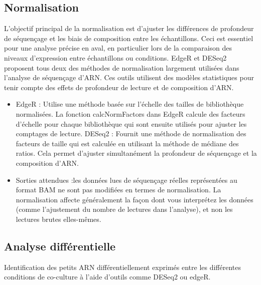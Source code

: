 \documentclass{report}
\begin{document}
\subsection{Normalisation}
L’objectif principal de la normalisation est d’ajuster les différences de profondeur de séquençage et les biais de composition entre les échantillons. Ceci est essentiel pour une analyse précise en aval, en particulier lors de la comparaison des niveaux d’expression entre échantillons ou conditions.
EdgeR\cite{robinson2010edger} et DESeq2\cite{love2014moderated} proposent tous deux des méthodes de normalisation largement utilisées dans l’analyse de séquençage d’ARN. Ces outils utilisent des modèles statistiques pour tenir compte des effets de profondeur de lecture et de composition d’ARN. \\

\begin{itemize}
    \item EdgeR : Utilise une méthode basée sur l'échelle des tailles de bibliothèque normalisées. La fonction calcNormFactors dans EdgeR calcule des facteurs d'échelle pour chaque bibliothèque qui sont ensuite utilisés pour ajuster les comptages de lecture.
    DESeq2 : Fournit une méthode de normalisation des facteurs de taille qui est calculée en utilisant la méthode de médiane des ratios. Cela permet d'ajuster simultanément la profondeur de séquençage et la composition d'ARN.
    \item Sorties attendues :les données lues de séquençage réelles représentées au format BAM ne sont pas modifiées en termes de normalisation. La normalisation affecte généralement la façon dont vous interprétez les données (comme l'ajustement du nombre de lectures dans l'analyse), et non les lectures brutes elles-mêmes.
\end{itemize}

\subsection{Analyse différentielle}
Identification des petits ARN différentiellement exprimés entre les différentes conditions de co-culture à l'aide d'outils comme DESeq2 \cite{love2014moderated} ou edgeR\cite{robinson2010edger}.\\
\end{document}

